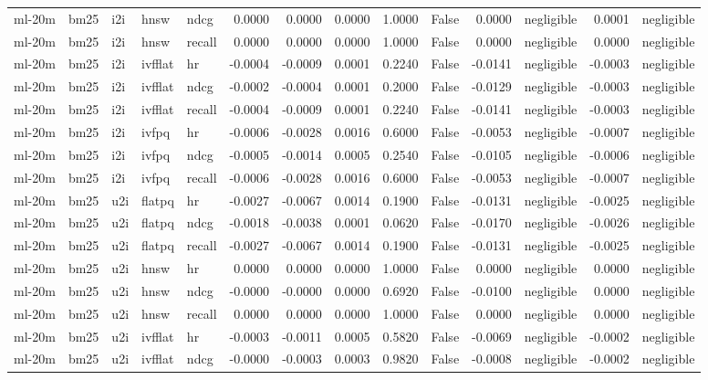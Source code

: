 \begin{tabular}{lllllrrrrrrlrl}
ml-20m & bm25 & i2i & hnsw & ndcg & 0.0000 & 0.0000 & 0.0000 & 1.0000 & False & 0.0000 & negligible & 0.0001 & negligible \\
ml-20m & bm25 & i2i & hnsw & recall & 0.0000 & 0.0000 & 0.0000 & 1.0000 & False & 0.0000 & negligible & 0.0000 & negligible \\
ml-20m & bm25 & i2i & ivfflat & hr & -0.0004 & -0.0009 & 0.0001 & 0.2240 & False & -0.0141 & negligible & -0.0003 & negligible \\
ml-20m & bm25 & i2i & ivfflat & ndcg & -0.0002 & -0.0004 & 0.0001 & 0.2000 & False & -0.0129 & negligible & -0.0003 & negligible \\
ml-20m & bm25 & i2i & ivfflat & recall & -0.0004 & -0.0009 & 0.0001 & 0.2240 & False & -0.0141 & negligible & -0.0003 & negligible \\
ml-20m & bm25 & i2i & ivfpq & hr & -0.0006 & -0.0028 & 0.0016 & 0.6000 & False & -0.0053 & negligible & -0.0007 & negligible \\
ml-20m & bm25 & i2i & ivfpq & ndcg & -0.0005 & -0.0014 & 0.0005 & 0.2540 & False & -0.0105 & negligible & -0.0006 & negligible \\
ml-20m & bm25 & i2i & ivfpq & recall & -0.0006 & -0.0028 & 0.0016 & 0.6000 & False & -0.0053 & negligible & -0.0007 & negligible \\
ml-20m & bm25 & u2i & flatpq & hr & -0.0027 & -0.0067 & 0.0014 & 0.1900 & False & -0.0131 & negligible & -0.0025 & negligible \\
ml-20m & bm25 & u2i & flatpq & ndcg & -0.0018 & -0.0038 & 0.0001 & 0.0620 & False & -0.0170 & negligible & -0.0026 & negligible \\
ml-20m & bm25 & u2i & flatpq & recall & -0.0027 & -0.0067 & 0.0014 & 0.1900 & False & -0.0131 & negligible & -0.0025 & negligible \\
ml-20m & bm25 & u2i & hnsw & hr & 0.0000 & 0.0000 & 0.0000 & 1.0000 & False & 0.0000 & negligible & 0.0000 & negligible \\
ml-20m & bm25 & u2i & hnsw & ndcg & -0.0000 & -0.0000 & 0.0000 & 0.6920 & False & -0.0100 & negligible & 0.0000 & negligible \\
ml-20m & bm25 & u2i & hnsw & recall & 0.0000 & 0.0000 & 0.0000 & 1.0000 & False & 0.0000 & negligible & 0.0000 & negligible \\
ml-20m & bm25 & u2i & ivfflat & hr & -0.0003 & -0.0011 & 0.0005 & 0.5820 & False & -0.0069 & negligible & -0.0002 & negligible \\
ml-20m & bm25 & u2i & ivfflat & ndcg & -0.0000 & -0.0003 & 0.0003 & 0.9820 & False & -0.0008 & negligible & -0.0002 & negligible \\

\end{tabular}
